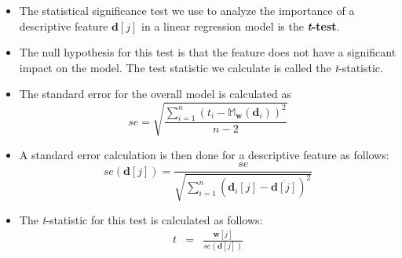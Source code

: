 \documentclass[xcolor={table}]{beamer}
\newcommand{\keyword}[1]{\alert{\textbf{#1}}\index{#1}}
\begin{document}
 \begin{frame} 
 \begin{itemize}
 \item The statistical significance test we use to analyze the importance of a descriptive feature $\mathbf{d}\left[j\right]$ in a linear regression model is the \keyword{\textit{t}-test}.
\item The null hypothesis for this test is that the feature does not have a significant impact on the model. The test statistic we calculate is called the \textit{t}-statistic.
\end{itemize}
\end{frame}

\begin{frame}
\begin{itemize}
\item The standard error for the overall model is calculated as
\begin{equation}
se = \sqrt{\frac{\displaystyle \sum_{i=1}^{n} \left( t_i - \mathbb{M}_{\mathbf{w}}(\mathbf{d}_i) \right)^2}{n - 2}} \label{eqn:standardError}
\end{equation}
\item A standard error calculation is then done for a descriptive feature as follows:
\begin{equation}
se(\mathbf{d}\left[j\right])  =  \frac{se}{\sqrt{\displaystyle \sum_{i=1}^{n} \left( \mathbf{d}_i\left[j\right] - \overline{\mathbf{d}\left[j\right]} \right)^2}} 
\label{eqn:descriptivefeatureStandardError}
\end{equation}
\item The \textit{t}-statistic for this test is calculated as follows:
\begin{eqnarray}
t & = & \frac{\mathbf{w}\left[j\right]}{se\left(\mathbf{d}\left[j\right]\right)} \label{eqn:tStat}
\end{eqnarray}
\end{itemize}
\end{frame} 
\end{document}
